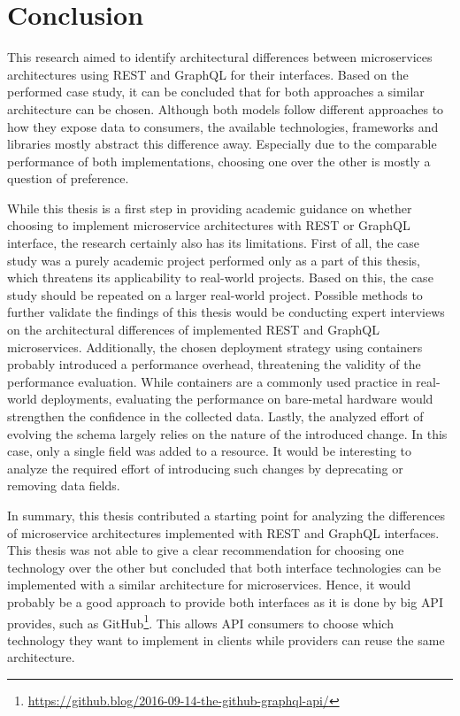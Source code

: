 \section{Conclusion}\label{sec:conclusion}

This research aimed to identify architectural differences between microservices architectures using \ac{REST} and GraphQL for their interfaces.
Based on the performed case study, it can be concluded that for both approaches a similar architecture can be chosen.
Although both models follow different approaches to how they expose data to consumers, the available technologies, frameworks and libraries mostly abstract this difference away.
Especially due to the comparable performance of both implementations, choosing one over the other is mostly a question of preference.

While this thesis is a first step in providing academic guidance on whether choosing to implement microservice architectures with \ac{REST} or GraphQL interface, the research certainly also has its limitations.
First of all, the case study was a purely academic project performed only as a part of this thesis, which threatens its applicability to real-world projects.
Based on this, the case study should be repeated on a larger real-world project.
Possible methods to further validate the findings of this thesis would be conducting expert interviews on the architectural differences of implemented \ac{REST} and GraphQL microservices.
Additionally, the chosen deployment strategy using containers probably introduced a performance overhead, threatening the validity of the performance evaluation.
While containers are a commonly used practice in real-world deployments, evaluating the performance on bare-metal hardware would strengthen the confidence in the collected data.
Lastly, the analyzed effort of evolving the schema largely relies on the nature of the introduced change.
In this case, only a single field was added to a resource.
It would be interesting to analyze the required effort of introducing such changes by deprecating or removing data fields.

In summary, this thesis contributed a starting point for analyzing the differences of microservice architectures implemented with \ac{REST} and GraphQL interfaces.
This thesis was not able to give a clear recommendation for choosing one technology over the other but concluded that both interface technologies can be implemented with a similar architecture for microservices.
Hence, it would probably be a good approach to provide both interfaces as it is done by big \ac{API} provides, such as GitHub\footnote{\url{https://github.blog/2016-09-14-the-github-graphql-api/}}.
This allows \ac{API} consumers to choose which technology they want to implement in clients while providers can reuse the same architecture.


